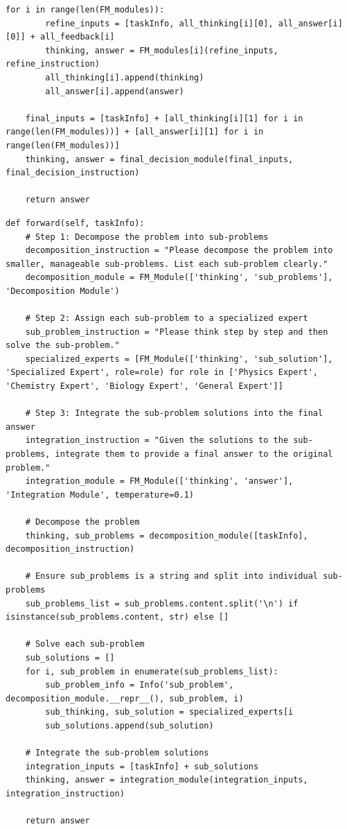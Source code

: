\documentclass{article}
\begin{document}
\begin{lstlisting}[style=pythonstyle, caption={Example discovered agent: Multi-Step Peer Review Agent}]
    for i in range(len(FM_modules)):
        refine_inputs = [taskInfo, all_thinking[i][0], all_answer[i][0]] + all_feedback[i]
        thinking, answer = FM_modules[i](refine_inputs, refine_instruction)
        all_thinking[i].append(thinking)
        all_answer[i].append(answer)

    final_inputs = [taskInfo] + [all_thinking[i][1] for i in range(len(FM_modules))] + [all_answer[i][1] for i in range(len(FM_modules))]
    thinking, answer = final_decision_module(final_inputs, final_decision_instruction)

    return answer
\end{lstlisting}


\begin{lstlisting}[style=pythonstyle, caption={Example discovered agent: Divide and Conquer Agent}]
def forward(self, taskInfo):
    # Step 1: Decompose the problem into sub-problems
    decomposition_instruction = "Please decompose the problem into smaller, manageable sub-problems. List each sub-problem clearly."
    decomposition_module = FM_Module(['thinking', 'sub_problems'], 'Decomposition Module')

    # Step 2: Assign each sub-problem to a specialized expert
    sub_problem_instruction = "Please think step by step and then solve the sub-problem."
    specialized_experts = [FM_Module(['thinking', 'sub_solution'], 'Specialized Expert', role=role) for role in ['Physics Expert', 'Chemistry Expert', 'Biology Expert', 'General Expert']]

    # Step 3: Integrate the sub-problem solutions into the final answer
    integration_instruction = "Given the solutions to the sub-problems, integrate them to provide a final answer to the original problem."
    integration_module = FM_Module(['thinking', 'answer'], 'Integration Module', temperature=0.1)

    # Decompose the problem
    thinking, sub_problems = decomposition_module([taskInfo], decomposition_instruction)

    # Ensure sub_problems is a string and split into individual sub-problems
    sub_problems_list = sub_problems.content.split('\n') if isinstance(sub_problems.content, str) else []

    # Solve each sub-problem
    sub_solutions = []
    for i, sub_problem in enumerate(sub_problems_list):
        sub_problem_info = Info('sub_problem', decomposition_module.__repr__(), sub_problem, i)
        sub_thinking, sub_solution = specialized_experts[i 
        sub_solutions.append(sub_solution)

    # Integrate the sub-problem solutions
    integration_inputs = [taskInfo] + sub_solutions
    thinking, answer = integration_module(integration_inputs, integration_instruction)

    return answer
\end{lstlisting}
\end{document}
